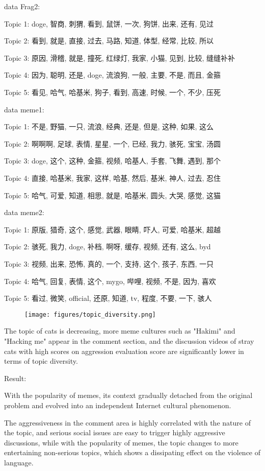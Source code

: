 \documentclass[12pt,a4paper]{ctexart}
\begin{document}
data Frag2:

Topic 1: doge, 智商, 刺猬, 看到, 鼠饼, 一次, 狗饼, 出来, 还有, 见过

Topic 2: 看到, 就是, 直接, 过去, 马路, 知道, 体型, 经常, 比较, 所以

Topic 3: 原因, 滑稽, 就是, 撞死, 红绿灯, 我家, 小猫, 见到, 比较, 缝缝补补

Topic 4: 因为, 聪明, 还是, doge, 流浪狗, 一般, 主要, 不是, 而且, 金箍

Topic 5: 看见, 哈气, 哈基米, 狗子, 看到, 高速, 时候, 一个, 不少, 压死

data meme1:

Topic 1: 不是, 野猫, 一只, 流浪, 经典, 还是, 但是, 这种, 如果, 这么

Topic 2: 啊啊啊, 足球, 表情, 星星, 一个, 已经, 我力, 骇死, 宝宝, 汤圆

Topic 3: doge, 这个, 这种, 金箍, 视频, 哈基人, 手套, 飞舞, 遇到, 那个

Topic 4: 直接, 哈基米, 我家, 这样, 哈基, 然后, 基米, 神人, 过去, 忍住

Topic 5: 哈气, 可爱, 知道, 相思, 就是, 哈基米, 圆头, 大哭, 感觉, 这猫

data meme2:

Topic 1: 原版, 猎奇, 这个, 感觉, 武器, 眼睛, 吓人, 可爱, 哈基米, 超越

Topic 2: 骇死, 我力, doge, 补档, 啊呀, 缓存, 视频, 还有, 这么, byd

Topic 3: 视频, 出来, 恐怖, 真的, 一个, 支持, 这个, 孩子, 东西, 一只

Topic 4: 哈气, 回复, 表情, 这个, mygo, 哔哩, 视频, 不是, 因为, 喜欢

Topic 5: 看过, 微笑, official, 还原, 知道, tv, 程度, 不要, 一下, 骇人

\begin{figure}[htbp]
    \centering
    \texttt{[image: figures/topic\_diversity.png]}
\end{figure}

The topic of cats is decreasing, more meme cultures such as "Hakimi" and "Hacking me" appear in the comment section, and the discussion videos of stray cats with high scores on aggression evaluation score are significantly lower in terms of topic diversity.

Result:

With the popularity of memes, its context gradually detached from the original problem and evolved into an independent Internet cultural phenomenon.

The aggressiveness in the comment area is highly correlated with the nature of the topic, and serious social issues are easy to trigger highly aggressive discussions, while with the popularity of memes, the topic changes to more entertaining non-serious topics, which shows a dissipating effect on the violence of language.
\end{document}
